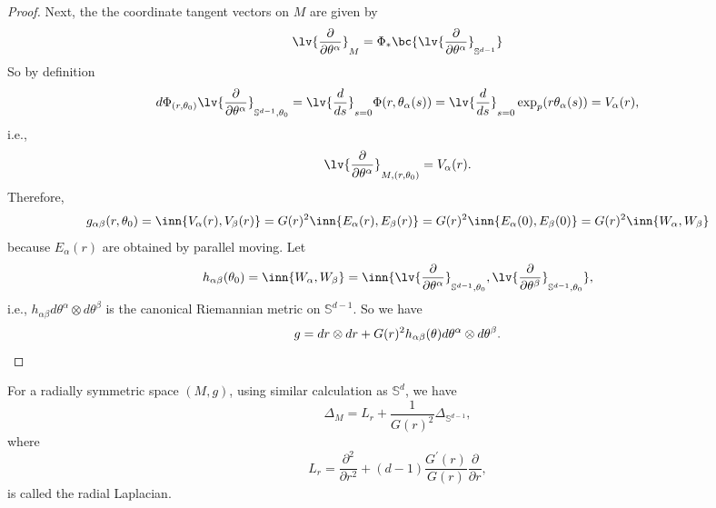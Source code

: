 \begin{proof}
    Next, the the coordinate tangent vectors on $M$ are given by
    \begin{equation*}
        \lv{\frac{\partial}{\partial \theta^\alpha}}_M = \Phi_*\bc{\lv{\frac{\partial}{\partial \theta^\alpha}}_{\mathbb{S}^{d-1}}}
    \end{equation*}
    So by definition
    \begin{equation*}
        d\Phi_{(r,\theta_0)} \lv{\frac{\partial}{\partial \theta^\alpha}}_{\mathbb{S}^{d-1},\theta_0} = \lv{\frac{d}{ds}}_{s = 0} \Phi(r,\theta_\alpha(s)) = \lv{\frac{d}{ds}}_{s = 0}\exp_p(r\theta_\alpha(s)) = V_\alpha(r),
    \end{equation*}
    i.e.,
    \begin{equation*}
        \lv{\frac{\partial}{\partial \theta^\alpha}}_{M,(r,\theta_0)} = V_{\alpha}(r).
    \end{equation*}
    Therefore,
    \begin{equation*}
        g_{\alpha\beta}(r,\theta_0) = \inn{V_{\alpha}(r),V_{\beta}(r)} = G(r)^2\inn{E_\alpha(r),E_\beta(r)} = G(r)^2\inn{E_\alpha(0),E_\beta(0)} = G(r)^2\inn{W_\alpha,W_\beta}
    \end{equation*}
    because $E_\alpha(r)$ are obtained by parallel moving. Let
    \begin{equation*}
        h_{\alpha\beta}(\theta_0) = \inn{W_\alpha,W_\beta} = \inn{\lv{\frac{\partial}{\partial \theta^\alpha}}_{\mathbb{S}^{d-1},\theta_0} ,\lv{\frac{\partial}{\partial \theta^\beta}}_{\mathbb{S}^{d-1},\theta_0} },
    \end{equation*}
    i.e., $h_{\alpha \beta}d\theta^\alpha \otimes d\theta^\beta$ is the canonical Riemannian metric on $\mathbb{S}^{d-1}$. So we have
    \begin{equation*}
        g = dr \otimes dr + G(r)^2h_{\alpha \beta}(\theta)d\theta^\alpha \otimes d\theta^\beta. \qedhere
    \end{equation*}
\end{proof}

For a radially symmetric space $(M,g)$, using similar calculation as $\mathbb{S}^d$, we have
\begin{equation*}
    \Delta_{M} = L_r + \frac{1}{G(r)^2}\Delta_{\mathbb{S}^{d-1}},
\end{equation*}
where
\begin{equation*}
    L_r = \frac{\partial^2}{\partial r^2}+ (d-1)\frac{G^\prime(r)}{G(r)}\frac{\partial}{\partial r},
\end{equation*}
is called the radial Laplacian.



